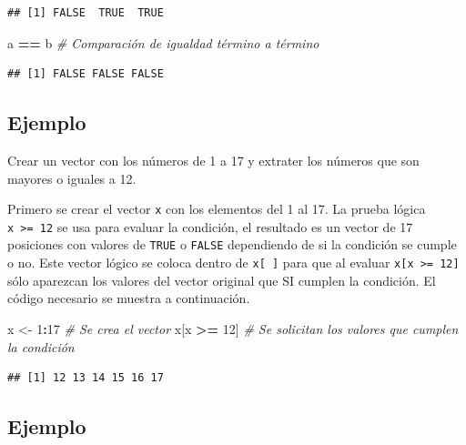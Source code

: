 \documentclass[10pt,]{krantz}
\makeatletter
\newenvironment{Shaded}{\begin{snugshade}}{\end{snugshade}}
\newcommand{\DecValTok}[1]{\textcolor[rgb]{0.00,0.00,0.81}{#1}}
\newcommand{\StringTok}[1]{\textcolor[rgb]{0.31,0.60,0.02}{#1}}
\newcommand{\CommentTok}[1]{\textcolor[rgb]{0.56,0.35,0.01}{\textit{#1}}}
\newcommand{\OperatorTok}[1]{\textcolor[rgb]{0.81,0.36,0.00}{\textbf{#1}}}
\newcommand{\NormalTok}[1]{#1}
\newenvironment{kframe}{%
\medskip{}
\setlength{\fboxsep}{.8em}
 \def\at@end@of@kframe{}%
 \ifinner\ifhmode%
  \def\at@end@of@kframe{\end{minipage}}%
  \begin{minipage}{\columnwidth}%
 \fi\fi%
 \def\FrameCommand##1{\hskip\@totalleftmargin \hskip-\fboxsep
 \colorbox{shadecolor}{##1}\hskip-\fboxsep
     \hskip-\linewidth \hskip-\@totalleftmargin \hskip\columnwidth}%
 \MakeFramed {\advance\hsize-\width
   \@totalleftmargin\z@ \linewidth\hsize
   \@setminipage}}%
 {\par\unskip\endMakeFramed%
 \at@end@of@kframe}
\renewenvironment{Shaded}{\begin{kframe}}{\end{kframe}}
\makeatother
\begin{document}
\begin{verbatim}
## [1] FALSE  TRUE  TRUE
\end{verbatim}

\begin{Shaded}
\begin{Highlighting}[]
\NormalTok{a }\OperatorTok{==}\StringTok{ }\NormalTok{b  }\CommentTok{# Comparación de igualdad término a término}
\end{Highlighting}
\end{Shaded}

\begin{verbatim}
## [1] FALSE FALSE FALSE
\end{verbatim}

\subsection*{Ejemplo}\label{ejemplo-6}


Crear un vector con los números de 1 a 17 y extrater los números que son
mayores o iguales a 12.

Primero se crear el vector \texttt{x} con los elementos del 1 al 17. La
prueba lógica \texttt{x\ \textgreater{}=\ 12} se usa para evaluar la
condición, el resultado es un vector de 17 posiciones con valores de
\texttt{TRUE} o \texttt{FALSE} dependiendo de si la condición se cumple
o no. Este vector lógico se coloca dentro de \texttt{x{[}\ {]}} para que
al evaluar \texttt{x{[}x\ \textgreater{}=\ 12{]}} sólo aparezcan los
valores del vector original que SI cumplen la condición. El código
necesario se muestra a continuación.

\begin{Shaded}
\begin{Highlighting}[]
\NormalTok{x <-}\StringTok{ }\DecValTok{1}\OperatorTok{:}\DecValTok{17}  \CommentTok{# Se crea el vector}
\NormalTok{x[x }\OperatorTok{>=}\StringTok{ }\DecValTok{12}\NormalTok{]  }\CommentTok{# Se solicitan los valores que cumplen la condición}
\end{Highlighting}
\end{Shaded}

\begin{verbatim}
## [1] 12 13 14 15 16 17
\end{verbatim}

\subsection*{Ejemplo}\label{ejemplo-7}
\end{document}
